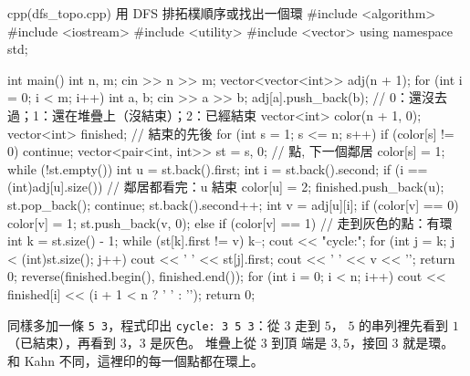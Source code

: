 \begin{example}[label=ex:dfs-topo]{cpp}{(dfs\_topo.cpp) 用 DFS 排拓樸順序或找出一個環}
#include <algorithm>
#include <iostream>
#include <utility>
#include <vector>
using namespace std;

int main() {
    int n, m;
    cin >> n >> m;
    vector<vector<int>> adj(n + 1);
    for (int i = 0; i < m; i++) {
        int a, b;
        cin >> a >> b;
        adj[a].push_back(b);
    }
    // 0：還沒去過；1：還在堆疊上（沒結束）；2：已經結束
    vector<int> color(n + 1, 0);
    vector<int> finished;                       // 結束的先後
    for (int s = 1; s <= n; s++) {
        if (color[s] != 0) {
            continue;
        }
        vector<pair<int, int>> st = {{s, 0}};   // 點, 下一個鄰居
        color[s] = 1;
        while (!st.empty()) {
            int u = st.back().first;
            int i = st.back().second;
            if (i == (int)adj[u].size()) {      // 鄰居都看完：u 結束
                color[u] = 2;
                finished.push_back(u);
                st.pop_back();
                continue;
            }
            st.back().second++;
            int v = adj[u][i];
            if (color[v] == 0) {
                color[v] = 1;
                st.push_back({v, 0});
            } else if (color[v] == 1) {         // 走到灰色的點：有環
                int k = st.size() - 1;
                while (st[k].first != v) {
                    k--;
                }
                cout << "cycle:";
                for (int j = k; j < (int)st.size(); j++) {
                    cout << ' ' << st[j].first;
                }
                cout << ' ' << v << '\n';
                return 0;
            }
        }
    }
    reverse(finished.begin(), finished.end());
    for (int i = 0; i < n; i++) {
        cout << finished[i] << (i + 1 < n ? ' ' : '\n');
    }
    return 0;
}
\end{example}


同樣多加一條 \texttt{5 3}，程式印出 \texttt{cycle: 3 5 3}：從 $3$ 走到 $5$，
$5$ 的串列裡先看到 $1$（已結束），再看到 $3$，$3$ 是灰色。 堆疊上從 $3$ 到頂
端是 $3, 5$，接回 $3$ 就是環。 和 Kahn 不同，這裡印的每一個點都在環上。

